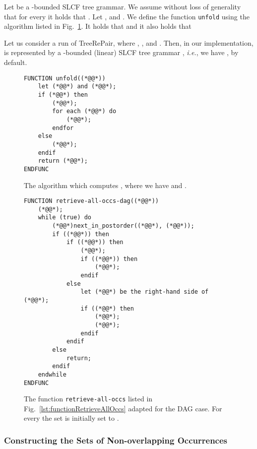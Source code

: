 \documentclass[12pt]{llncs}
\newcommand{\trp}{\mbox{TreeRePair}\xspace}
\newcommand{\hairsp}{\hspace{1pt}}\newcommand{\TODO}{\textcolor{red}{\bf TODO!}\xspace}
\newcommand{\ie}{\mbox{\textit{i.\hairsp{}e.}}\xspace}
\begin{document}
Let  be a -bounded SLCF tree grammar. We assume without loss of generality that for every  it holds that . Let ,  and . We define the function \texttt{unfold} using the algorithm listed in Fig.~\ref{lst:functionUnfold}.
It holds that  and it also holds that

Let us consider a run  of \trp, where , ,  and . Then, in our implementation,  is represented by a \mbox{-bounded} (linear) SLCF tree grammar , \ie, we have , by default.

\begin{figure}[tb]	
	\begin{lstlisting}
FUNCTION unfold((*@@*))
	let (*@@*) and (*@@*);
	if (*@@*) then
		(*@@*);
		for each (*@@*) do
			(*@@*);
		endfor
	else
		(*@@*);
	endif
	return (*@@*);
ENDFUNC
	\end{lstlisting}
	\caption{The algorithm which computes , where we have  and .}\label{lst:functionUnfold}
\end{figure}
\begin{figure}[tb]
	\begin{lstlisting}
FUNCTION retrieve-all-occs-dag((*@@*))
	(*@@*);
	while (true) do
		(*@@*)next_in_postorder((*@@*), (*@@*));
		if ((*@@*)) then
			if ((*@@*)) then
				(*@@*);
				if ((*@@*)) then
					(*@@*);
				endif
			else
				let (*@@*) be the right-hand side of (*@@*);
				if ((*@@*) then
					(*@@*);
					(*@@*);
				endif
			endif
		else
			return;
		endif
	endwhile
ENDFUNC
	\end{lstlisting}
	\caption{The function \texttt{retrieve-all-occs} listed in Fig.~\ref{lst:functionRetrieveAllOccs} adapted for the DAG case. For every  the set  is initially set to .}\label{lst:functionRetrieveAllOccsDAG}
\end{figure}

\subsubsection{Constructing the Sets of Non-overlapping Occurrences} 
\end{document}
